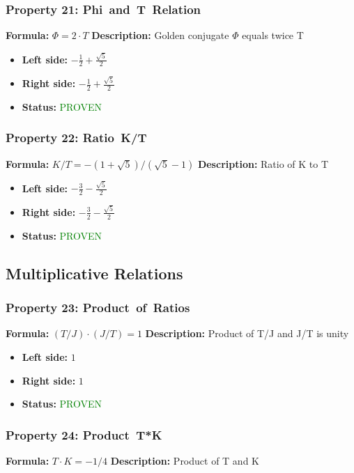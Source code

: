 \subsubsection*{Property 21: Phi~and~T~Relation}
\textbf{Formula:} $\Phi = 2 \cdot T$
\textbf{Description:} Golden conjugate $\Phi$ equals twice T

\begin{itemize}
\item \textbf{Left side:} $- \frac{1}{2} + \frac{\sqrt{5}}{2}$
\item \textbf{Right side:} $- \frac{1}{2} + \frac{\sqrt{5}}{2}$
\item \textbf{Status:} \textcolor{green}{PROVEN}
\end{itemize}

\subsubsection*{Property 22: Ratio~K/T}
\textbf{Formula:} $K/T = -(1+\sqrt{5})/(\sqrt{5}-1)$
\textbf{Description:} Ratio of K to T

\begin{itemize}
\item \textbf{Left side:} $- \frac{3}{2} - \frac{\sqrt{5}}{2}$
\item \textbf{Right side:} $- \frac{3}{2} - \frac{\sqrt{5}}{2}$
\item \textbf{Status:} \textcolor{green}{PROVEN}
\end{itemize}


\subsection{Multiplicative Relations}

\subsubsection*{Property 23: Product~of~Ratios}
\textbf{Formula:} $(T/J)  \cdot  (J/T) = 1$
\textbf{Description:} Product of T/J and J/T is unity

\begin{itemize}
\item \textbf{Left side:} $1$
\item \textbf{Right side:} $1$
\item \textbf{Status:} \textcolor{green}{PROVEN}
\end{itemize}

\subsubsection*{Property 24: Product~T*K}
\textbf{Formula:} $T  \cdot  K = -1/4$
\textbf{Description:} Product of T and K

